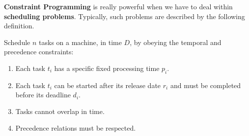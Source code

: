 \textbf{Constraint Programming} is really powerful when we have to deal within \textbf{scheduling problems}. Typically, such problems are described by the 
following definition.
\begin{definition}[title = Task scheduling definition]
    Schedule $n$ tasks on a machine, in time $D$, by obeying the temporal and precedence constraints:
    \begin{enumerate}
        \item Each task $t_i$ has a specific fixed processing time $p_i$.
        \item Each task $t_i$ can be started after its release date $r_i$ and must be completed before its deadline $d_i$.
        \item Tasks cannot overlap in time.
        \item Precedence relations must be respected.
    \end{enumerate}
\end{definition}
